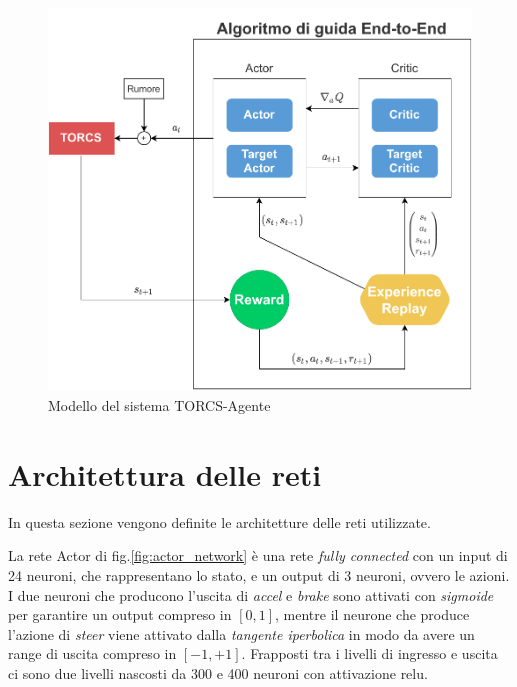 \begin{figure}[hb]
    \center
    \includegraphics[width = 6in]{Figures/Chapter4/model_ddpg.drawio.pdf}
    \caption{Modello del sistema TORCS-Agente}
    \label{fig:system_model}
\end{figure}

\clearpage

\section{Architettura delle reti}

In questa sezione vengono definite le architetture delle reti utilizzate.
\newline

La rete Actor di fig.\ref{fig:actor_network} è una rete \textit{fully connected} con un input di 24 neuroni, che rappresentano lo stato, e un output di 3 neuroni, ovvero le azioni. I due neuroni che producono l'uscita di \textit{accel} e \textit{brake} sono attivati con \textit{sigmoide} per garantire un output compreso in $[0,1]$, mentre il neurone che produce l'azione di \textit{steer} viene attivato dalla \textit{tangente iperbolica} in modo da avere un range di uscita compreso in $[-1,+1]$. Frapposti tra i livelli di ingresso e uscita ci sono due livelli nascosti da 300 e 400 neuroni con attivazione relu.



